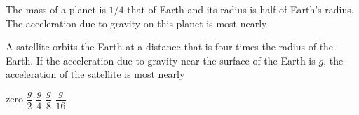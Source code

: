 \documentclass{../../oss-apphys-exam}
\begin{document}
\begin{multicols*}{2}
\begin{questions}
    \question The mass of a planet is $1/4$ that of Earth and its radius is
    half of Earth's radius. The acceleration due to gravity on this planet is
    most nearly
    

    \question A satellite orbits the Earth at a distance that is four times the
    radius of the Earth. If the acceleration due to gravity near the surface of
    the Earth is $g$, the acceleration of the satellite is most nearly
    \begin{choices}
      \choice zero
      \choice $\dfrac g2$
      \choice $\dfrac g4$
      \choice $\dfrac g8$
      \choice $\dfrac g{16}$
    \end{choices}
    \columnbreak
    

\end{questions}
\end{multicols*}
\end{document}
